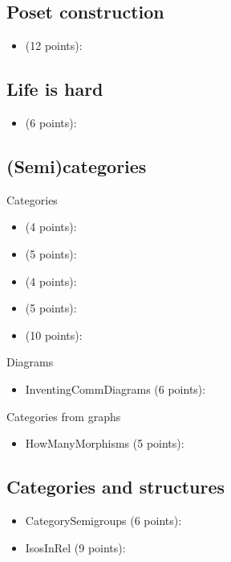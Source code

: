 \subsection{Poset construction}
\begin{itemize}
    \item {} (12 points): 
\end{itemize}

\subsection{Life is hard}
\begin{itemize}
    \item {} (6 points): 
\end{itemize}

\subsection{(Semi)categories}

Categories
\begin{itemize}
    \item {} (4 points): 
    \item {} (5 points): 
    \item {} (4 points): 
    \item {} (5 points): 
    \item {} (10 points): 
\end{itemize}

Diagrams
\begin{itemize}
    \item InventingCommDiagrams (6 points): 
\end{itemize}

Categories from graphs
\begin{itemize}
    \item HowManyMorphisms (5 points): 
\end{itemize}

\subsection{Categories and structures}
\begin{itemize}
    \item CategorySemigroups (6 points): 
    \item IsosInRel (9 points): 
\end{itemize}

